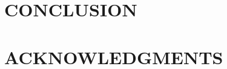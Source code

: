 \documentclass[%
 reprint,
 amsmath,amssymb,
 aps,
]{revtex4-1}
\begin{document}
\section{\label{sec:application}CONCLUSION}


\section{\label{sec:application}ACKNOWLEDGMENTS}



%
% 
%
\end{document}
